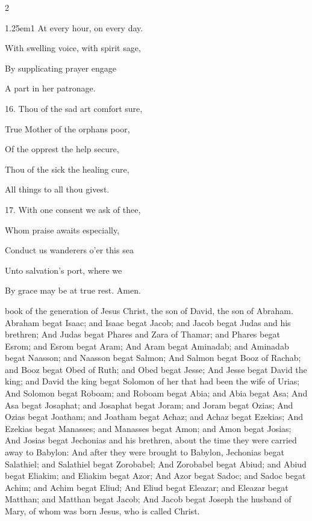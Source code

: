 \begin{multicols}{2}
\begin{hangparas}{1.25em}{1}
At every hour, on every day.

With swelling voice, with spirit sage,

By supplicating prayer engage

A part in her patronage.%

\newcolumn

16. Thou of the sad art comfort sure,

True Mother of the orphans poor,

Of the opprest the help secure,

Thou of the sick the healing cure,

All things to all thou givest.%

\newcolumn

17. With one consent we ask of thee,

Whom praise awaits especially,

Conduct us wanderers o'er this sea

Unto salvation's port, where we

By grace may be at true rest. Amen.
\end{hangparas}
\end{multicols}

 book of the generation of Jesus Christ, the son of David, the son of Abraham. Abraham begat Isaac; and Isaac begat Jacob; and Jacob begat Judas and his brethren; And Judas begat Phares and Zara of Thamar; and Phares begat Esrom; and Esrom begat Aram; And Aram begat Aminadab; and Aminadab begat Naasson; and Naasson begat Salmon; And Salmon begat Booz of Rachab; and Booz begat Obed of Ruth; and Obed begat Jesse; And Jesse begat David the king; and David the king begat Solomon of her that had been the wife of Urias; And Solomon begat Roboam; and Roboam begat Abia; and Abia begat Asa; And Asa begat Josaphat; and Josaphat begat Joram; and Joram begat Ozias; And Ozias begat Joatham; and Joatham begat Achaz; and Achaz begat Ezekias; And Ezekias begat Manasses; and Manasses begat Amon; and Amon begat Josias; And Josias begat Jechonias and his brethren, about the time they were carried away to Babylon: And after they were brought to Babylon, Jechonias begat Salathiel; and Salathiel begat Zorobabel; And Zorobabel begat Abiud; and Abiud begat Eliakim; and Eliakim begat Azor; And Azor begat Sadoc; and Sadoc begat Achim; and Achim begat Eliud; And Eliud begat Eleazar; and Eleazar begat Matthan; and Matthan begat Jacob; And Jacob begat Joseph the husband of Mary, of whom was born Jesus, who is called Christ.


